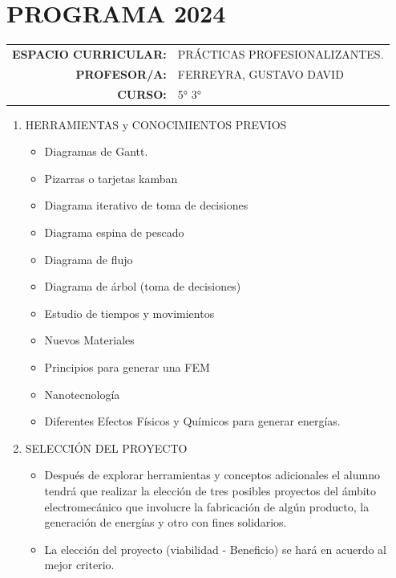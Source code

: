 \documentclass[planificacion2024.tex]{subfiles}
\begin{document}
\section*{\centering PROGRAMA 2024}
\begin{tabular}{r l}

\textbf{ESPACIO CURRICULAR:} &PRÁCTICAS PROFESIONALIZANTES. \\

\textbf{PROFESOR/A:}& FERREYRA, GUSTAVO DAVID\\

\textbf{CURSO:}&5° 3°\\


     
\end{tabular}

    
  \begin{enumerate}
    \item HERRAMIENTAS y CONOCIMIENTOS PREVIOS 
    \begin{itemize}
\item Diagramas de Gantt.
\item Pizarras o tarjetas kamban
\item Diagrama iterativo de toma de decisiones
\item Diagrama espina de pescado
\item Diagrama de flujo
\item Diagrama de árbol (toma de decisiones)
\item Estudio de tiempos y movimientos
\item Nuevos Materiales
\item Principios para generar una FEM
\item Nanotecnología
\item Diferentes Efectos Físicos y Químicos para
generar energías.
    \end{itemize}
    
    \item SELECCIÓN DEL PROYECTO
    \begin{itemize}
        \item Después de explorar herramientas y conceptos
adicionales el alumno tendrá que realizar la
elección de tres posibles proyectos del ámbito
electromecánico que involucre la fabricación de
algún producto, la generación de energías y
otro con fines solidarios.
\item La elección del proyecto (viabilidad -
Beneficio) se hará en acuerdo al mejor criterio. 
    \end{itemize}
    

\end{enumerate}
\end{document}
